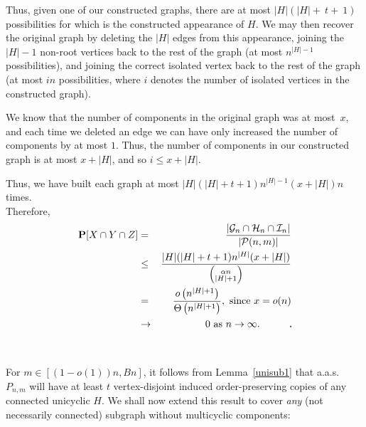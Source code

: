 \documentclass{article}
\newtheorem{Proof of Theorem}{Proof of Theorem}
\begin{document}
Thus, given one of our constructed graphs,
there are at most $|H|(|H|+~\!t+~\!1)$
possibilities for which is the constructed appearance of $H$.
We may then recover the original graph by deleting the $|H|$ edges from this appearance,
joining the $|H|-1$ non-root vertices back to the rest of the graph
(at most $n^{|H|-1}$ possibilities),
and joining the correct isolated vertex back to the rest of the graph
(at most $in$ possibilities,
where $i$ denotes the number of isolated vertices in the constructed graph).

We know that the number of components in the original graph was at most~$x$,
and each time we deleted an edge we can have only increased the number of components by at most $1$.
Thus, the number of components in our constructed graph is at most $x+|H|$,
and so $i \leq x+|H|$.

Thus, we have built each graph at most
$|H|(|H|+t+1)n^{|H|-1}(x+|H|)n$ times. \\

Therefore,
\begin{eqnarray*}
\mathbf{P}[X \cap Y \cap Z]
& = & \frac{|\mathcal{G}_{n} \cap \mathcal{H}_{n} \cap \mathcal{I}_{n}|}{|\mathcal{P}(n,m)|} \\
& \leq & \frac{|H|(|H|+t+1)n^{|H|}(x+|H|)}
{\left( ^{\phantom{w} \alpha n}_{|H|+1} \right) } \\
& = & \frac{o \left( n^{|H|+1} \right) }{\Theta \left( n^{|H|+1} \right) }, \textrm{ since } x=o(n)\\
& \to & 0 \textrm{ as } n \to \infty.
\phantom{qwerty}\begin{picture}(1,1)
\put(0,0){\line(1,0){1}}
\put(0,0){\line(0,1){1}}
\put(1,1){\line(-1,0){1}}
\put(1,1){\line(0,-1){1}}
\end{picture} 
\end{eqnarray*}
\\
\\














For $m \in [(1-o(1))n,Bn]$,
it follows from Lemma~\ref{unisub1} that a.a.s.~$P_{n,m}$ 
will have at least $t$ vertex-disjoint induced order-preserving copies of any connected unicyclic $H$.
We shall now extend this result to cover \textit{any} (not necessarily connected) subgraph without multicyclic components:
\\
\end{document}
